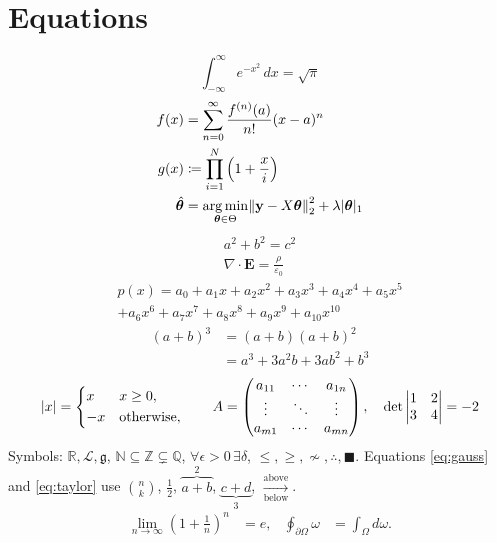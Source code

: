 \documentclass{article}
\DeclarePairedDelimiter\abs{\lvert}{\rvert}
\DeclarePairedDelimiter\norm{\lVert}{\rVert}
\DeclareMathOperator*{\argmin}{arg\,min}
\begin{document}
\section{Equations}
\begin{equation}\label{eq:gauss}
\int_{-\infty}^{\infty} e^{-x^2}\,dx = \sqrt{\pi}
\end{equation}
\begin{align}
f(x) &= \sum_{n=0}^{\infty} \frac{f^{(n)}(a)}{n!}(x-a)^n \label{eq:taylor}\\
g(x) &\coloneqq \prod_{i=1}^{N} \left(1 + \frac{x}{i}\right) \nonumber\\
\hat{\bm\theta} &= \argmin_{\bm\theta \in \Theta} \norm*{\mathbf{y} - X\bm\theta}_2^2 + \lambda\abs{\bm\theta}_1
\end{align}
\begin{gather}
a^2 + b^2 = c^2 \\ \nabla \cdot \mathbf{E} = \frac{\rho}{\varepsilon_0}
\end{gather}
\begin{multline}
p(x) = a_0 + a_1x + a_2x^2 + a_3x^3 + a_4x^4 + a_5x^5 \\ + a_6x^6 + a_7x^7 + a_8x^8 + a_9x^9 + a_{10}x^{10}
\end{multline}
\begin{equation}
\begin{split}
(a+b)^3 &= (a+b)(a+b)^2\\ &= a^3 + 3a^2b + 3ab^2 + b^3
\end{split}
\end{equation}
\[
|x| = \begin{dcases} x & x \ge 0,\\ -x & \text{otherwise},\end{dcases}\qquad
A = \begin{pmatrix} a_{11} & \cdots & a_{1n}\\ \vdots & \ddots & \vdots\\ a_{m1} & \cdots & a_{mn}\end{pmatrix},\quad
\det\begin{vmatrix}1&2\\3&4\end{vmatrix} = -2
\]
Symbols: $\mathbb{R}, \mathcal{L}, \mathfrak{g}$, $\mathbb{N}\subseteq\mathbb{Z}\subsetneq\mathbb{Q}$, $\forall\epsilon>0\,\exists\delta$, $\leqslant, \geqslant, \nsim, \therefore, \blacksquare$.
Equations \eqref{eq:gauss} and \eqref{eq:taylor} use $\binom{n}{k}$, $\tfrac12$, $\overbrace{a+b}^{2}$, $\underbrace{c+d}_{3}$, $\xrightarrow[\text{below}]{\text{above}}$.
\begin{align*}
\lim_{n\to\infty}\left(1+\frac{1}{n}\right)^n &= e, & \oint_{\partial\Omega} \omega &= \int_\Omega d\omega.
\end{align*}
\end{document}
